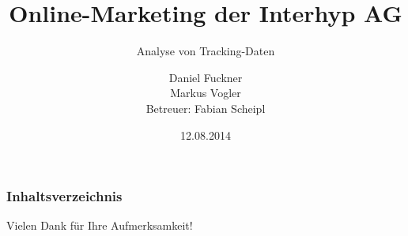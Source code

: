 \documentclass{beamer}
\begin{document}
\title{Online-Marketing der Interhyp AG}
\subtitle{Analyse von Tracking-Daten} 
\author[D. Fuckner \& M. Vogler]{Daniel Fuckner\\Markus Vogler\\Betreuer: Fabian Scheipl}
\date{12.08.2014} 

\begin{frame}
	\titlepage
\end{frame}

\begin{frame}\frametitle{Inhaltsverzeichnis}
	\tableofcontents[hideallsubsections]
\end{frame}







\begin{frame}
	\centering \huge
	Vielen Dank für Ihre Aufmerksamkeit!
\end{frame}
\end{document}
